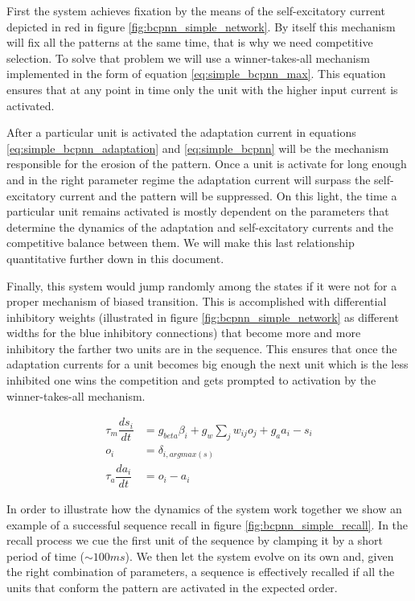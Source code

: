 \documentclass[10pt,a4paper]{article}
\begin{document}
First the system achieves fixation by the means of the self-excitatory current depicted in red in figure \ref{fig:bcpnn_simple_network}. By itself this mechanism will fix all the patterns at the same time, that is why we need competitive selection.  To solve that problem we will use a winner-takes-all mechanism \cite{yuille1998winner} implemented in the form of equation \ref{eq:simple_bcpnn_max}. This equation ensures that at any point in time only the unit with the higher input current is activated. 


After a particular unit is activated the adaptation current in equations \ref{eq:simple_bcpnn_adaptation} and \ref{eq:simple_bcpnn}  will be the mechanism responsible for the erosion of the pattern. Once a unit is activate for long enough and in the right parameter regime the adaptation current will surpass the self-excitatory current and the pattern will be suppressed. On this light, the time a particular unit remains activated is mostly dependent on the parameters that determine the dynamics of the adaptation and self-excitatory currents and the competitive balance between them. We will make this last relationship quantitative further down in this document. 

Finally, this system would jump randomly among the states if it were not for a proper mechanism of biased transition. This is accomplished with differential inhibitory weights (illustrated in figure \ref{fig:bcpnn_simple_network} as different widths for the blue inhibitory connections) that become more and more inhibitory the farther two units are in the sequence. This ensures that once the adaptation currents for a unit becomes big enough the next unit which is the less inhibited one wins the competition and gets prompted to activation by the winner-takes-all mechanism.  

\begin{align}
\tau_m \dfrac{ds_i}{dt} &= g_{beta}\beta_i + g_{w}\sum_{j} w_{ij} o_j + g_a a_i - s_i \label{eq:simple_bcpnn} \\ 
o_i &=  \delta_{i, argmax(s)} \label{eq:simple_bcpnn_max} \\ 
\tau_a \dfrac{da_i}{dt} &= o_i - a_i \label{eq:simple_bcpnn_adaptation}
\end{align}

In order to illustrate how the dynamics of the system work together we show an example of a successful sequence recall in figure \ref{fig:bcpnn_simple_recall}. In the recall process we cue the first unit of the sequence by clamping it by a short period of time ($\sim 100ms$). We then let the system evolve on its own and, given the right combination of parameters, a sequence is effectively recalled if all the units that conform the pattern are activated in the expected order. 
\end{document}
